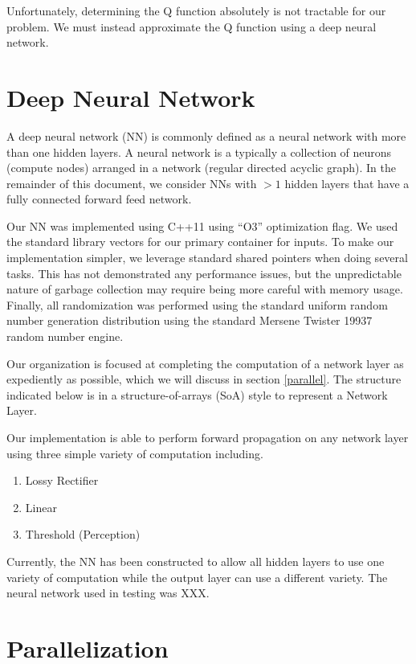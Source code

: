 Unfortunately, determining the Q function absolutely is not tractable for our problem.
We must instead approximate the Q function using a deep neural network.

\section*{Deep Neural Network}
A deep neural network (NN) is commonly defined as a neural network with more than one hidden layers.
A neural network is a typically a collection of neurons (compute nodes) arranged in a network (regular directed acyclic graph).
In the remainder of this document, we consider NNs with $>1$ hidden layers that have a fully connected forward feed network.

Our NN was implemented using C++11 using ``O3'' optimization flag.
We used the standard library vectors for our primary container for inputs.
To make our implementation simpler, we leverage standard shared pointers when doing several tasks.
This has not demonstrated any performance issues, but the unpredictable nature of garbage collection may require being more careful with memory usage.
Finally, all randomization was performed using the standard uniform random number generation distribution using the standard Mersene Twister 19937 random number engine.

Our organization is focused at completing the computation of a network layer as expediently as possible, which we will discuss in section \ref{parallel}.
The structure indicated below is in a structure-of-arrays (SoA) style to represent a Network Layer.


Our implementation is able to perform forward propagation on any network layer using three simple variety of computation including.
\begin{enumerate}
\item Lossy Rectifier
\item Linear
\item Threshold (Perception)
\end{enumerate}
Currently, the NN has been constructed to allow all hidden layers to use one variety of computation while the output layer can use a different variety.
The neural network used in testing was XXX.


\section*{Parallelization}

